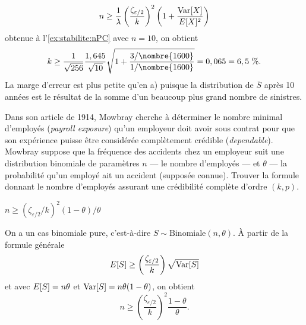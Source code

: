 \begin{exercice}
\begin{sol}
\begin{enumerate}
      \begin{displaymath}
        n \geq \frac{1}{\lambda}
        \left(
          \frac{\zeta_{\varepsilon/2}}{k}
        \right)^2
        \left(
          1 + \frac{\operatorname{Var} [ X ]}{E [ X ]^2}
        \right)
      \end{displaymath}
      obtenue à l'\autoref{ex:stabilite:nPC}
      avec $n = 10$, on obtient
      \begin{displaymath}
        k \geq
        \frac{1}{\sqrt{256}} \frac{1,645}{\sqrt{10}}
        \sqrt{1 + \frac{3/\nombre{1600}}{1/\nombre{1600}}} = 0,065 = 6,5~\%.
      \end{displaymath}
      La marge d'erreur est plus petite qu'en a) puisque la
      distribution de $\bar{S}$ après 10 années est le résultat de la
      somme d'un beaucoup plus grand nombre de sinistres.
    \end{enumerate}
  \end{sol}
\end{exercice}

\begin{exercice}
  Dans son article de 1914, Mowbray cherche à déterminer le nombre
  minimal d'employés (\emph{payroll exposure}) qu'un employeur doit
  avoir sous contrat pour que son expérience puisse être considérée
  complètement crédible (\emph{dependable}). Mowbray suppose que la
  fréquence des accidents chez un employeur suit une distribution
  binomiale de paramètres $n$ --- le nombre d'employés --- et $\theta$
  --- la probabilité qu'un employé ait un accident (supposée connue).
  Trouver la formule donnant le nombre d'employés assurant une
  crédibilité complète d'ordre $(k, p)$.
  \begin{rep}
    $n \geq (\zeta_{\varepsilon/2}/k)^2 (1 - \theta)/\theta$
  \end{rep}
  \begin{sol}
    On a un cas binomiale pure, c'est-à-dire $S \sim
    \text{Binomiale}(n, \theta)$. À partir de la formule générale
    \begin{displaymath}
      E [ S ] \geq \left( \frac{\zeta_{\varepsilon/2}}{k} \right)
      \sqrt{\operatorname{Var} [ S ]}
    \end{displaymath}
    et avec $E [ S ] = n \theta$ et $\operatorname{Var} [ S ] = n \theta (1 - \theta)$,
    on obtient
    \begin{displaymath}
      n \geq \left( \frac{\zeta_{\varepsilon/2}}{k} \right)^2
      \frac{1 - \theta}{\theta}.
    \end{displaymath}
  \end{sol}
\end{exercice}

